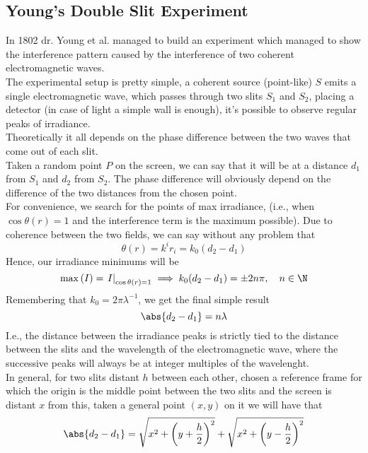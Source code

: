 \documentclass[../electromagnetism.tex]{subfiles}
\begin{document}
\subsection{Young's Double Slit Experiment}
In 1802 dr. Young et al. managed to build an experiment which managed to show the interference pattern caused by the interference of two coherent electromagnetic waves.\\
The experimental setup is pretty simple, a coherent source (point-like) $S$ emits a single electromagnetic wave, which passes through two slits $S_1$ and $S_2$, placing a detector (in case of light a simple wall is enough), it's possible to observe regular peaks of irradiance.\\
Theoretically it all depends on the phase difference between the two waves that come out of each slit.\\
Taken a random point $P$ on the screen, we can say that it will be at a distance $d_1$ from $S_1$ and $d_2$ from $S_2$. The phase difference will obviously depend on the difference of the two distances from the chosen point.\\
For convenience, we search for the points of max irradiance, (i.e., when $\cos\theta(r)=1$ and the interference term is the maximum possible). Due to coherence between the two fields, we can say without any problem that
\begin{equation*}
	\theta(r)=k^ir_i=k_0(d_2-d_1)
\end{equation*}
Hence, our irradiance minimums will be 
\begin{equation*}
	\max\left( I \right)=\left. I\right|_{\cos\theta(r)=1}\implies k_0(d_2-d_1)=\pm2n\pi,\quad n\in\N
\end{equation*}
Remembering that $k_0=2\pi\lambda^{-1}$, we get the final simple result
\begin{equation}
	\abs{d_2-d_1}=n\lambda
	\label{eq:interfdist}
\end{equation}
I.e., the distance between the irradiance peaks is strictly tied to the distance between the slits and the wavelength of the electromagnetic wave, where the successive peaks will always be at integer multiples of the wavelenght.\\
In general, for two slits distant $h$ between each other, chosen a reference frame for which the origin is the middle point between the two slits and the screen is distant $x$ from this, taken a general point $(x,y)$ on it we will have that
\begin{equation*}
	\abs{d_2-d_1}=\sqrt{x^2+\left( y+\frac{h}{2} \right)^2}+\sqrt{x^2+\left( y-\frac{h}{2} \right)^2}
\end{equation*}
\end{document}
